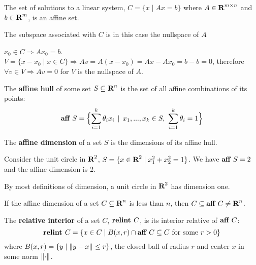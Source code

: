 \begin{Fact}
  The set of solutions to a linear system, $C = \{x \mid Ax=b\}$ where
  $A\in\textbf{R}^{m\times n}$ and $b\in\textbf{R}^m$, is an affine set.

  The subspace associated with $C$ is in this case the nullspace of $A$

  \begin{Proof}
    $x_0\in C\Rightarrow Ax_0=b$. $V=\{x-x_0 \mid x\in C\}\Rightarrow Av = A(x-x_0) =
    Ax-Ax_0=b-b=0$, therefore $\forall v\in V\Rightarrow Av = 0$ for $V$ is the
    nullspace of $A$.
  \end{Proof}
\end{Fact}

\begin{Definition}
  The \textbf{affine hull} of some set $S\subseteq \textbf{R}^n$ is the set of all
  affine combinations of its points:
  \begin{equation*}
    \textbf{aff }S = \Bigl\{\sum_{i=1}^k\theta_ix_i \, \mid \, x_1,...,x_k\in S,\,\,\sum_{i=1}^k\theta_i=1\Bigr\}
  \end{equation*}
\end{Definition}

\begin{Definition}
  The \textbf{affine dimension} of a set $S$ is the dimensions of its affine
  hull.
\end{Definition}

\begin{Example}
  Consider the unit circle in $\textbf{R}^2$, $S = \{x\in\textbf{R}^2 \mid x_1^2+x_2^2 =
  1\}$. We have $\textbf{aff }S = 2$ and the affine dimension is 2.

  \begin{Fact}
    By most definitions of dimension, a unit circle in $\textbf{R}^2$ has
    dimension one.
  \end{Fact}
\end{Example}

\begin{Fact}
  If the affine dimension of a set $C\subseteq \textbf{R}^n$ is less than $n$, then
  $C\subseteq \textbf{aff }C\ne\textbf{R}^n$.
\end{Fact}

\begin{Definition}
  The \textbf{relative interior} of a set $C$, $\textbf{relint }C$, is its interior
  relative of $\textbf{aff }C$:
  \begin{equation*}
    \textbf{relint }C = \{
    x\in C \mid B(x,r)\cap\textbf{aff }C\subseteq C\text{ for some }r>0
    \}
  \end{equation*}
  where $B(x,r) = \{y \mid \left\|y-x\right\|_{}\le r\}$, the closed ball of radius $r$ and
  center $x$ in some norm $\left\|\cdot\right\|_{}$.
\end{Definition}

